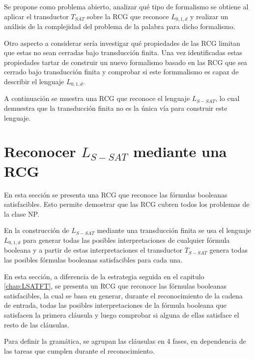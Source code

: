 Se propone como problema abierto, analizar qué tipo de formalismo se obtiene al aplicar el transductor $T_{SAT}$ sobre la RCG que reconoce $L_{0,1,d}$ y realizar un análisis de la complejidad del problema de la palabra para dicho formalismo.

Otro aspecto a considerar sería investigar qué propiedades de las RCG limitan que estas no sean cerradas bajo transducción finita.
Una vez identificadas estas propiedades tartar de construir un nuevo formalismo basado en las RCG que sea cerrado bajo transducción finita
y comprobar si este formmalismo es capaz de describir el lenguaje $L_{0,1,d}$.

A continuación se muestra una RCG que reconoce el lenguaje $L_{S-SAT}$, lo cual demuestra que la transducción
finita no es la única vía para construir este lenguaje.

\section{Reconocer $L_{S-SAT}$ mediante una RCG}

En esta sección se presenta una RCG que reconoce las fórmulas booleanas satisfacibles. Esto permite demostrar que las RCG cubren todos los problemas de la clase NP.

En la construcción de $L_{S-SAT}$ mediante una transducción finita se usa el lenguaje $L_{0,1,d}$ para generar todas las posibles interpretaciones de cualquier fórmula booleana y a partir de estas interpretaciones el transductor $T_{S-SAT}$ genera todas las posibles fórmulas booleanas satisfacibles para cada una. 

En esta sección, a diferencia de la estrategia seguida en el capitulo \ref{chap:LSATFT}, se presenta un RCG que reconoce las fórmulas booleanas satisfacibles, la cual se basa en generar, durante el reconocimiento de la cadena de entrada, todas las posibles interpretaciones de la fórmula booleana que satisfacen la primera cláusula y luego comprobar si alguna de ellas satisface el resto de las cláusulas.

Para definir la gramática, se agrupan las cláusulas en 4 fases, en dependencia de las tareas que cumplen durante el reconocimiento.

